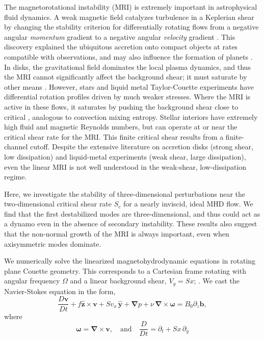 \documentclass[aps,prl,reprint,superscriptaddress]{revtex4-1}
\begin{document}
\pacs{}
\maketitle

The magnetorotational instability (MRI) is extremely important in astrophysical fluid dynamics.
A weak magnetic field catalyzes turbulence in a Keplerian shear by changing the stability criterion for differentially rotating flows from a negative angular \emph{momentum} gradient to a negative angular \emph{velocity} gradient \citep[e.g.][]{1998RvMP...70....1B,2010RSPTA.368.1607J}.
This discovery explained the ubiquitous accretion onto compact objects at rates compatible with observations, and may also influence the formation of planets \citep[e.g.][]{2007Natur.448.1022J}.
In disks, the gravitational field dominates the local plasma dynamics, and thus the MRI cannot significantly affect the background shear; it must saturate by other means \citep{2018MNRAS.474.3451X}.
However, stars and liquid metal Taylor-Couette experiments have differential rotation profiles driven by much weaker stresses.
Where the MRI is active in these flows, it saturates by pushing the background shear close to critical \citep{2015RSPSA.47140699V,2017ApJ...841....1C,2017ApJ...841....2C}, analogous to convection mixing entropy.
Stellar interiors have extremely high fluid and magnetic Reynolds numbers, but can operate at or near the critical shear rate for the MRI.
This finite critical shear results from a finite-channel cutoff.
Despite the extensive literature on accretion disks (strong shear, low dissipation) and liquid-metal experiments (weak shear, large dissipation), even the linear MRI is not well understood in the weak-shear, low-dissipation regime. 

Here, we investigate the stability of three-dimensional perturbations near the two-dimensional critical shear rate $S_{c}$ for a nearly inviscid, ideal MHD flow.
We find that the first destabilized modes are three-dimensional, and thus could act as a dynamo even in the absence of secondary instability.
These results also suggest that the non-normal growth of the MRI is always important, even when axisymmetric modes dominate.

We numerically solve the linearized magnetohydrodynamic equations in rotating plane Couette geometry.
This corresponds to a Cartesian frame rotating with angular frequency $\Omega$ and a linear background shear, $V_{y}=Sx$; \citep[see][]{2015RSPSA.47140699V}.
We cast the Navier-Stokes equation in the form,
\begin{equation}\label{eq:mhd}
\frac{D \boldsymbol{v}}{Dt}+f \boldsymbol{\hat{z}}\times\boldsymbol{v}+{S}v_{x}\,\boldsymbol{\hat{y}}+\boldsymbol{\nabla}{p}+\nu\,\boldsymbol{\nabla}\times\boldsymbol{\omega}=B_{0}\partial_{z}\boldsymbol{b},
\end{equation}
where
\begin{equation}
\boldsymbol{\omega}=\boldsymbol{\nabla}\times\boldsymbol{v},\quad\text{and}\quad\frac{D}{Dt}=\partial_{t}+{S}x\,\partial_{y}\end{equation}
\end{document}
